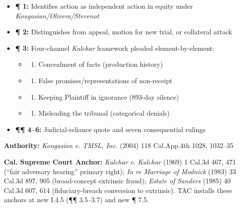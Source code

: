 \begin{itemize}
\tightlist
\item
  \textbf{¶ 1:} Identifies action as independent action in equity under \emph{Kougasian/Olivera/Stevenot}
\item
  \textbf{¶ 2:} Distinguishes from appeal, motion for new trial, or collateral attack
\item
  \textbf{¶ 3:} Four-channel \emph{Kulchar} framework pleaded element-by-element:

  \begin{itemize}
  \tightlist
  \item
    \begin{enumerate}
    \def\labelenumi{(\alph{enumi})}
    \tightlist
    \item
      Concealment of facts (production history)
    \end{enumerate}
  \item
    \begin{enumerate}
    \def\labelenumi{(\alph{enumi})}
    \setcounter{enumi}{1}
    \tightlist
    \item
      False promises/representations of non-receipt
    \end{enumerate}
  \item
    \begin{enumerate}
    \def\labelenumi{(\alph{enumi})}
    \setcounter{enumi}{2}
    \tightlist
    \item
      Keeping Plaintiff in ignorance (893-day silence)
    \end{enumerate}
  \item
    \begin{enumerate}
    \def\labelenumi{(\alph{enumi})}
    \setcounter{enumi}{3}
    \tightlist
    \item
      Misleading the tribunal (categorical denials)
    \end{enumerate}
  \end{itemize}
\item
  \textbf{¶¶ 4--6:} Judicial-reliance quote and seven consequential rulings
\end{itemize}

\textbf{Authority:} \emph{Kougasian v. TMSL, Inc.} (2004) 118 Cal.App.4th 1028, 1032--35

\textbf{Cal. Supreme Court Anchor:} \emph{Kulchar v. Kulchar} (1969) 1 Cal.3d 467, 471 (``fair adversary hearing'' primary right); \emph{In re Marriage of Modnick} (1983) 33 Cal.3d 897, 905 (broad-concept extrinsic fraud); \emph{Estate of Sanders} (1985) 40 Cal.3d 607, 614 (fiduciary-breach conversion to extrinsic). TAC installs these anchors at new \textsection{}I.4.5 (¶¶ 3.5--3.7) and new ¶ 7.5.


